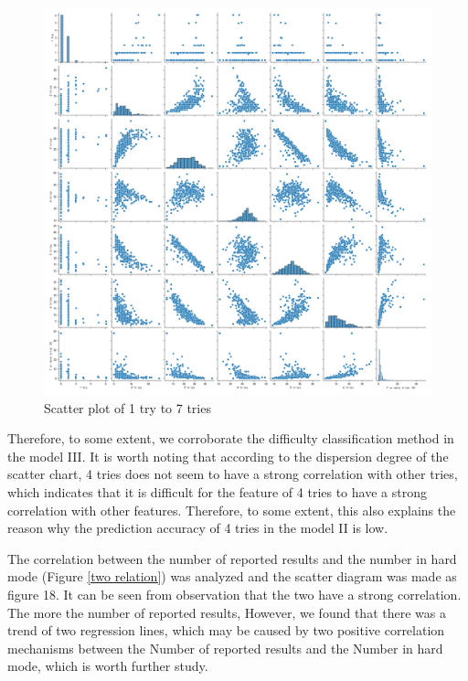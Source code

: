 \documentclass[
  journal=medium,
  manuscript=Report,
  year=2023,
  volume=37,
]{cup-journal}
\begin{document}
\begin{figure}[hbt!]
    \centering
    \includegraphics[width=\linewidth]{pic/tries相关性图.png}
    \caption{Scatter plot of 1 try to 7 tries}
    \label{scatter}
\end{figure}

Therefore, to some extent, we corroborate the difficulty classification method in the model III. It is worth noting that according to the dispersion degree of the scatter chart, 4 tries does not seem to have a strong correlation with other tries, which indicates that it is difficult for the feature of 4 tries to have a strong correlation with other features. Therefore, to some extent, this also explains the reason why the prediction accuracy of 4 tries in the model II is low.

The correlation between the number of reported results and the number in hard mode (Figure \ref{two relation}) was analyzed and the scatter diagram was made as figure 18. It can be seen from observation that the two have a strong correlation. The more the number of reported results, However, we found that there was a trend of two regression lines, which may be caused by two positive correlation mechanisms between the Number of reported results and the Number in hard mode, which is worth further study.
\end{document}
